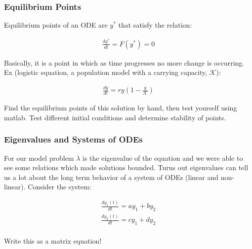 \documentclass{beamer}
\begin{document}
\begin{frame}
\frametitle{Equilibrium Points} 

Equilibrium points of an ODE are $y^*$ that satisfy the relation: 

\begin{align*}
\frac{dy^{*}}{dt} = {F}(y^{*}) = 0
\end{align*}

Basically, it is a point in which as time progresses no more change is occurring. Ex (logistic equation, a population model with a carrying capacity, $\mathcal{K}$):

\begin{align*}
\frac{dy}{dt} = ry(1-\frac{y}{\mathcal{K}})
\end{align*}

Find the equilibrium points of this solution by hand, then test yourself using matlab. Test different initial conditions and determine stability of points.
\end{frame}


\begin{frame}
\frametitle{Eigenvalues and Systems of ODEs} 

For our model problem $\lambda$ is the eigenvalue of the equation and we were able to see some relations which made solutions bounded. Turns out eigenvalues can tell us a lot about the long term behavior of a system of ODEs (linear and non-linear). Consider the system: 

\begin{align*}
\frac{dy_1(t)}{dt} = ay_1 + by_2\\
\frac{dy_2(t)}{dt} = cy_1 + dy_2\\
\end{align*}

Write this as a matrix equation! 

\end{frame}
\end{document}
